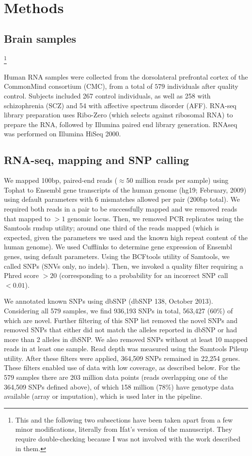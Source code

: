 \documentclass[letterpaper]{article}
\begin{document}
\section{Methods}

\subsection{Brain samples}

\footnote{This and the following two subsections
have been taken apart from a few minor modifications, literally from Ifat's
version of the manuscript.  They require double-checking because I was not
involved with the work described in them.}

Human RNA samples were collected from the dorsolateral prefrontal cortex of
the CommonMind consortium (CMC), from a total of \(579\) individuals after
quality control. Subjects included 267 control individuals, as well as 258
with schizophrenia (SCZ) and 54 with affective spectrum disorder (AFF).
RNA-seq library preparation uses Ribo-Zero (which selects against ribosomal
RNA) to prepare the RNA, followed by Illumina paired end library generation.
RNAseq was performed on Illumina HiSeq 2000.

\subsection{RNA-seq, mapping and SNP calling}

We mapped 100bp, paired-end reads (\(\approx50\) million reads per sample) using Tophat
to Ensembl gene transcripts of the human genome (hg19; February, 2009) using
default parameters with 6 mismatches allowed per pair (200bp total). We
required both reads in a pair to be successfully mapped and we removed reads
that mapped to \(>1\) genomic locus. Then, we removed PCR replicates using the
Samtools rmdup utility; around one third of the reads mapped (which is
expected, given the parameters we used and the known high repeat content of
the human genome). We used Cufflinks to determine gene expression of Ensembl
genes, using default parameters. Using the BCFtools utility of Samtools, we
called SNPs (SNVs only, no indels). Then, we invoked a quality filter
requiring a Phred score \(>20\) (corresponding to a probability for an
incorrect SNP call \(<0.01\)).

We annotated known SNPs using dbSNP (dbSNP 138, October 2013). Considering all
579 samples, we find 936,193 SNPs in total, 563,427 (60\%) of which are novel.
Further filtering of this SNP list removed the novel SNPs and removed SNPs
that either did not match the alleles reported in dbSNP or had more than 2
alleles in dbSNP. We also removed SNPs without at least 10 mapped reads in at
least one sample. Read depth was measured using the Samtools Pileup utility.
After these filters were applied, 364,509 SNPs remained in 22,254 genes. These
filters enabled use of data with low coverage, as described below. For the 579
samples there are 203 million data points (reads overlapping one of the
364,509 SNPs defined above), of which 158 million (78\%) have genotype data
available (array or imputation), which is used later in the pipeline.
\end{document}
